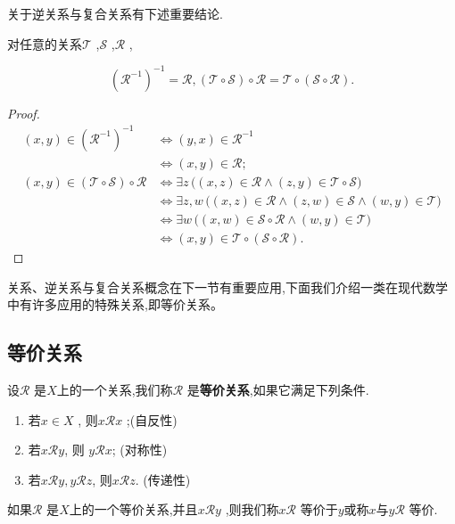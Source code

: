 关于逆关系与复合关系有下述重要结论.

\begin{myprop*}{}

对任意的关系\(\mathscr{T}\) ,\(\mathscr{S}\) ,\(\mathscr{R}\) ,

\[(\mathscr{R}^{-1})^{-1} = \mathscr{R}, (\mathscr{T} \circ \mathscr{S}) \circ \mathscr{R} = \mathscr{T} \circ (\mathscr{S} \circ \mathscr{R}).\]

\end{myprop*}

\begin{proof}


\begin{align*}
	(x, y) \in (\mathscr{R}^{-1})^{-1} &\iff (y, x) \in \mathscr{R}^{-1} \\
	&\iff (x, y) \in \mathscr{R}; \\[6pt]
	(x, y) \in (\mathscr{T} \circ \mathscr{S}) \circ \mathscr{R} 
	&\iff \exists z \, \bigl((x, z) \in \mathscr{R} \land (z, y) \in \mathscr{T} \circ \mathscr{S}\bigr) \\
	&\iff \exists z, w \, \bigl((x, z) \in \mathscr{R} \land (z, w) \in \mathscr{S} \land (w, y) \in \mathscr{T}\bigr) \\
	&\iff \exists w \, \bigl((x, w) \in \mathscr{S} \circ \mathscr{R} \land (w, y) \in \mathscr{T}\bigr) \\
	&\iff (x, y) \in \mathscr{T} \circ (\mathscr{S} \circ \mathscr{R}).
\end{align*}

\end{proof}

关系、逆关系与复合关系概念在下一节有重要应用,下面我们介绍一类在现代数学中有许多应用的特殊关系,即等价关系。

\subsection{等价关系}
	\label{sec:1-2-2}

\begin{mydef*}{}

设\(\mathscr{R}\) 是$X$上的一个关系,我们称\(\mathscr{R}\) 是\textbf{等价关系},如果它满足下列条件.

\begin{enumerate}[label=\arabic*)]

\item
  若\(x \in X\) , 则\(x \mathscr{R} x\) ;(自反性)

\item
  若$x\mathscr{R}y$, 则 $y\mathscr{R}x$; (对称性)

\item
  若$x\mathscr{R}y,y\mathscr{R}z$, 则$x\mathscr{R}z$. (传递性)
\end{enumerate}

如果\(\mathscr{R}\) 是$X$上的一个等价关系,并且\(x\mathscr{R}y\) ,则我们称\(x\mathscr{R}\) 等价于$y$或称$x$与\(y\)\(\mathscr{R}\) 等价.
\end{mydef*}

